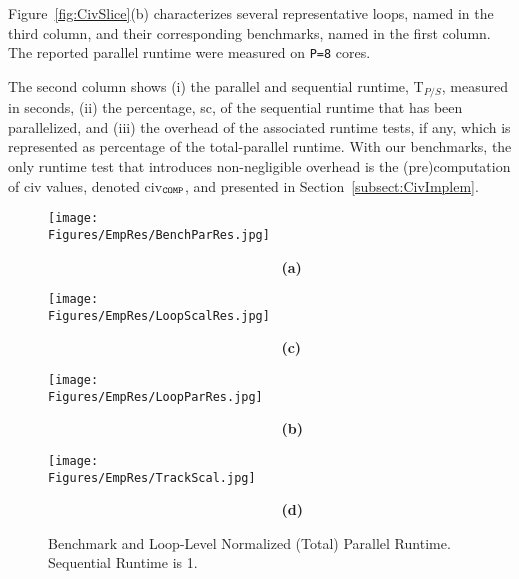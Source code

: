 \documentclass[10pt,nocopyrightspace]{sigplanconf}
\newcommand{\Figures}[1]{../Figures/}
\begin{document}
%
Figure~\ref{fig:CivSlice}(b) characterizes several representative loops, named in 
the third column, and their corresponding benchmarks, named in the first column.
The reported parallel runtime were measured on {\tt P=8} cores.


The second column shows 
(i)   the parallel and sequential runtime, T$_{P/S}$, measured in seconds,
(ii)  the percentage, {\sc sc}, of the sequential runtime that has been parallelized, and 
(iii) the overhead of the associated runtime tests, if any, which is represented as percentage of
        the total-parallel runtime. With our benchmarks, the only runtime test that introduces
        non-negligible overhead is the (pre)computation of {\sc civ} values, 
        denoted {\sc civ}$_{\tt{}COMP}$, and presented in Section~\ref{subsect:CivImplem}.   


\begin{figure*}[t] 
\begin{minipage}{1.2\columnwidth} 
    \texttt{[image: \\Figures/EmpRes/BenchParRes.jpg]} 

      {\bf~~~~~~~~~~~~~~~~~~~~~~~~~~~~~(a)} \vspace{2ex}

    \texttt{[image: \\Figures/EmpRes/LoopScalRes.jpg]}
      
      {\bf~~~~~~~~~~~~~~~~~~~~~~~~~~~~~(c)}\vspace{1ex}

\end{minipage}
\begin{minipage}{0.9\columnwidth}
    \texttt{[image: \\Figures/EmpRes/LoopParRes.jpg]} 

      {\bf~~~~~~~~~~~~~~~~~~~~~~~~~~~~~(b)}\vspace{2ex}

   \texttt{[image: \\Figures/EmpRes/TrackScal.jpg]}
      
      {\bf~~~~~~~~~~~~~~~~~~~~~~~~~~~~~(d)}\vspace{1ex}

\end{minipage}
\caption{ Benchmark and Loop-Level Normalized (Total) Parallel Runtime. Sequential Runtime is 1.}
\label{fig:ParRuntime} %
\end{figure*}
\end{document}
